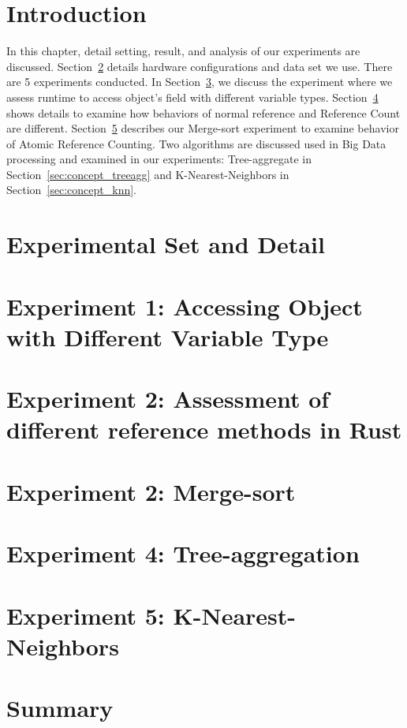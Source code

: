 \section{Introduction}
\label{sec:eval_intro}
In this chapter, detail setting, result, and analysis of our experiments are discussed.
Section~\ref{sec:eval_setdetail} details hardware configurations and data set we use. 
There are 5 experiments conducted. In Section~\ref{sec:eval_diffval}, we discuss the experiment 
where we assess runtime to access object's field with different variable types. 
Section~\ref{sec:eval_refcount} shows details to examine how behaviors of normal reference and Reference Count are different. 
Section~\ref{sec:eval_sort} describes our Merge-sort experiment to examine behavior of Atomic Reference Counting.
Two algorithms are discussed used in Big Data processing and examined in our experiments: 
Tree-aggregate in Section~\ref{sec:concept_treeagg} and K-Nearest-Neighbors in Section~\ref{sec:concept_knn}.

\section{Experimental Set and Detail}
\label{sec:eval_setdetail}


\section{Experiment 1: Accessing Object with Different Variable Type}
\label{sec:eval_diffval}


\section{Experiment 2: Assessment of different reference methods in Rust}
\label{sec:eval_refcount}


\section{Experiment 2: Merge-sort}
\label{sec:eval_sort}



\section{Experiment 4: Tree-aggregation}
\label{sec:eval_treeagg}


\section{Experiment 5: K-Nearest-Neighbors}
\label{sec:eval_knn}


\section{Summary}
\label{sec:eval_summary}

% 